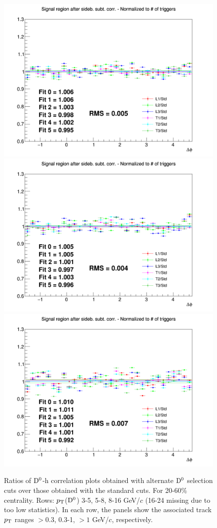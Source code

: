\begin{figure}
{\includegraphics[width=0.31\linewidth]{figuresVsCent/Dzero/SystDcuts/20_60/Ratio_AzimCorrDistr_Dzero_Canvas_PtIntBins9to11_PoolInt_thr03to99.png}}
{\includegraphics[width=0.31\linewidth]{figuresVsCent/Dzero/SystDcuts/20_60/Ratio_AzimCorrDistr_Dzero_Canvas_PtIntBins9to11_PoolInt_thr03to1.png}}
{\includegraphics[width=0.31\linewidth]{figuresVsCent/Dzero/SystDcuts/20_60/Ratio_AzimCorrDistr_Dzero_Canvas_PtIntBins9to11_PoolInt_thr1to99.png}} \\
 \caption{Ratios of ${\rm D^0}$-h correlation plots obtained with alternate ${\rm D^0}$ selection cuts over those obtained with the standard cuts. For 20-60\% centrality. Rows: $p_{\rm T}$(${\rm D^0}$) 3-5, 5-8, 8-16 GeV/$c$ (16-24 missing due to too low statistics). In each row, the panels show the associated track
$p_{\rm T}$ ranges $> 0.3$, 0.3-1, $> 1$ GeV/$c$, respectively.}
\label{fig:SysDcut2060}
\end{figure}
